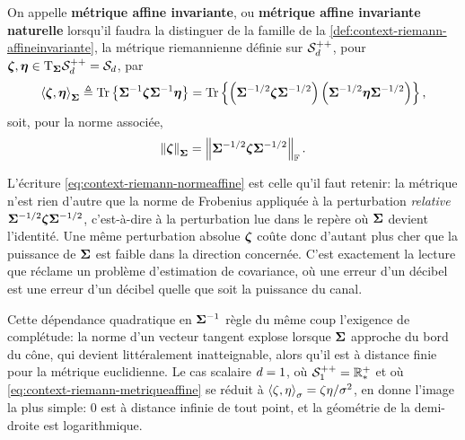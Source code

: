 \begin{definition}
\label{def:context-riemann-metriquenaturelle}
  On appelle \textbf{métrique affine invariante}, ou \textbf{métrique affine invariante naturelle} lorsqu'il faudra la distinguer de la famille de la \cref{def:context-riemann-affineinvariante}, la métrique riemannienne définie sur $\mathcal{S}_{d}^{++}$, pour $\boldsymbol{\zeta},\boldsymbol{\eta}\in\mathrm{T}_{\boldsymbol{\Sigma}}\mathcal{S}_{d}^{++}=\mathcal{S}_{d}$, par
  \begin{equation}
    \left\langle \boldsymbol{\zeta}, \boldsymbol{\eta} \right\rangle_{\boldsymbol{\Sigma}}
    \triangleq
    \operatorname{\operatorname{Tr}}\left\{{\boldsymbol{\Sigma}}^{-1}\boldsymbol{\zeta}{\boldsymbol{\Sigma}}^{-1}\boldsymbol{\eta}\right\}
    =
    \operatorname{\operatorname{Tr}}\left\{
      \left(\boldsymbol{\Sigma}^{-1/2}\boldsymbol{\zeta}\boldsymbol{\Sigma}^{-1/2}\right)
      \left(\boldsymbol{\Sigma}^{-1/2}\boldsymbol{\eta}\boldsymbol{\Sigma}^{-1/2}\right)
    \right\},
    \label{eq:context-riemann-metriqueaffine}
  \end{equation}
  soit, pour la norme associée,
  \begin{equation}
    \left\lVert \boldsymbol{\zeta} \right\rVert_{\boldsymbol{\Sigma}}
    =
    \left\lVert\boldsymbol{\Sigma}^{-1/2}\boldsymbol{\zeta}\boldsymbol{\Sigma}^{-1/2}\right\rVert_{\mathbb{F}}.
    \label{eq:context-riemann-normeaffine}
  \end{equation}
\end{definition}

\begin{remark}
\label{rem:context-riemann-lecturemetrique}
  L'écriture \cref{eq:context-riemann-normeaffine} est celle qu'il faut retenir: la métrique n'est rien d'autre que la norme de Frobenius appliquée à la perturbation \emph{relative} $\boldsymbol{\Sigma}^{-1/2}\boldsymbol{\zeta}\boldsymbol{\Sigma}^{-1/2}$, c'est-à-dire à la perturbation lue dans le repère où $\boldsymbol{\Sigma}$ devient l'identité. Une même perturbation absolue $\boldsymbol{\zeta}$ coûte donc d'autant plus cher que la puissance de $\boldsymbol{\Sigma}$ est faible dans la direction concernée. C'est exactement la lecture que réclame un problème d'estimation de covariance, où une erreur d'un décibel est une erreur d'un décibel quelle que soit la puissance du canal.

  Cette dépendance quadratique en ${\boldsymbol{\Sigma}}^{-1}$ règle du même coup l'exigence de complétude: la norme d'un vecteur tangent explose lorsque $\boldsymbol{\Sigma}$ approche du bord du cône, qui devient littéralement inatteignable, alors qu'il est à distance finie pour la métrique euclidienne. Le cas scalaire $d=1$, où $\mathcal{S}_{1}^{++}=\mathbb{R}_*^+$ et où \cref{eq:context-riemann-metriqueaffine} se réduit à $\left\langle \zeta, \eta \right\rangle_{\sigma}=\zeta\eta/\sigma^2$, en donne l'image la plus simple: $0$ est à distance infinie de tout point, et la géométrie de la demi-droite est logarithmique.
\end{remark}

